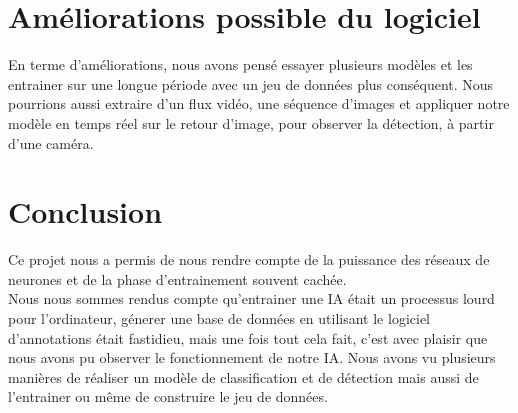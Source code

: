 \section{Améliorations possible du logiciel}
En terme d'améliorations, nous avons pensé essayer plusieurs modèles et les entrainer sur une longue période avec un jeu de données plus conséquent.
Nous pourrions aussi extraire d'un flux vidéo, une séquence d'images et appliquer notre modèle en temps réel sur le retour d'image, pour observer la détection, à partir d'une caméra.

\section{Conclusion}
Ce projet nous a permis de nous rendre compte de la puissance des réseaux de neurones et de la phase d'entrainement souvent cachée. \\
Nous nous sommes rendus compte qu'entrainer une IA était un processus lourd pour l'ordinateur, génerer une base de données en utilisant le logiciel d'annotations était fastidieu, mais une fois tout cela fait, c'est avec plaisir que nous avons pu observer le fonctionnement de notre IA.
Nous avons vu plusieurs manières de réaliser un modèle de classification et de détection mais aussi de l'entrainer ou même de construire le jeu de données.
